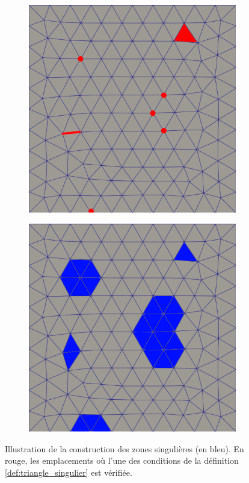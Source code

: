 \begin{figure}[htpb]
\centering
\begin{subfigure}{0.49\textwidth}
    \includegraphics[width=\textwidth]{images/zone_singuliere_1.pdf}
\end{subfigure}
\hfill
\begin{subfigure}{0.49\textwidth}
    \includegraphics[width=\textwidth]{images/zone_singuliere_2.pdf}
\end{subfigure}
\caption{Illustration de la construction des zones singulières (en bleu). En rouge, les emplacements où l'une des conditions de la définition \ref{def:triangle_singulier} est vérifiée.}
\label{fig:zone_singuliere}
\end{figure}

